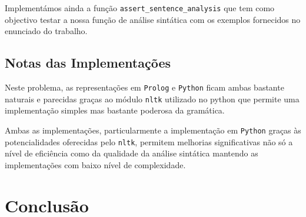 \documentclass[12pt,a4paper,oneside]{article}
\begin{document}
Implementámos ainda a função \texttt{assert\_sentence\_analysis} que tem como objectivo
testar a nossa função de análise sintática com os exemplos fornecidos no enunciado do
trabalho.

\subsection{Notas das Implementações}

Neste problema, as representações em \texttt{Prolog} e \texttt{Python} ficam ambas bastante
naturais e parecidas graças ao módulo \texttt{nltk} utilizado no python que permite uma
implementação simples mas bastante poderosa da gramática.

Ambas as implementações, particularmente a implementação em \texttt{Python} graças às
potencialidades oferecidas pelo \texttt{nltk}, permitem melhorias significativas não só a
nível de eficiência como da qualidade da análise sintática mantendo as implementações com
baixo nível de complexidade.



\section{Conclusão}
\label{sec:conc}

\lipsum[1]

\lipsum[2]



\end{document}
